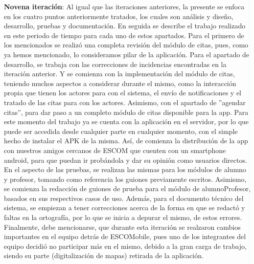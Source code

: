 \noindent
\newline
\textbf{Novena iteración}: Al igual que las iteraciones anteriores, la presente se enfoca en los cuatro puntos anteriormente tratados, los cuales son análisis y diseño, desarrollo, pruebas y documentación. En seguida se describe el trabajo realizado en este periodo de tiempo para cada uno de estos apartados. 
\newline
\newline
Para el primero de los mencionados se realizó una completa revisión del módulo de citas, pues, como ya hemos mencionado, lo consideramos pilar de la aplicación. 
\newline
\newline
Para el apartado de desarrollo, se trabaja con las correcciones de incidencias encontradas en la iteración anterior. Y se comienza con la implementación del módulo de citas, teniendo muchos aspectos a considerar durante el mismo, como la interacción propia que tienen los actores para con el sistema, el envío de notificaciones y el tratado de las citas para con los actores. Asimismo, con el apartado de ''agendar citas'', para dar paso a un completo módulo de citas disponible para la app. 
\newline
Para este momento del trabajo ya se cuenta con la aplicación en el servidor, por lo que puede ser accedida desde cualquier parte en cualquier momento, con el simple hecho de instalar el APK de la misma. Así, de comienza la distribución de la app con nuestros amigos cercanos de ESCOM que cuenten con un smartphone android, para que puedan ir probándola y dar su opinión como usuarios directos. 
\newline
\newline
En el aspecto de las pruebas, se realizan las mismas para los módulos de alumno y profesor, tomando como referencia los guiones previamente escritos. Asimismo, se comienza la redacción de guiones de prueba para el módulo de alumnoProfesor, basados en sus respectivos casos de uso. 
\newline
Además, para el documento técnico del sistema, se empiezan a tener correcciones acerca de la forma en que se redactó y faltas en la ortografía, por lo que se inicia a depurar el mismo, de estos errores.
\newline
\newline
Finalmente, debe mencionarse, que durante esta iteración se realzaron cambios importantes en el equipo detrás de ESCOMobile, pues uno de los integrantes del equipo decidió no participar más en el mismo, debido a la gran carga de trabajo, siendo su parte (digitalización de mapas) retirada de la aplicación. 

